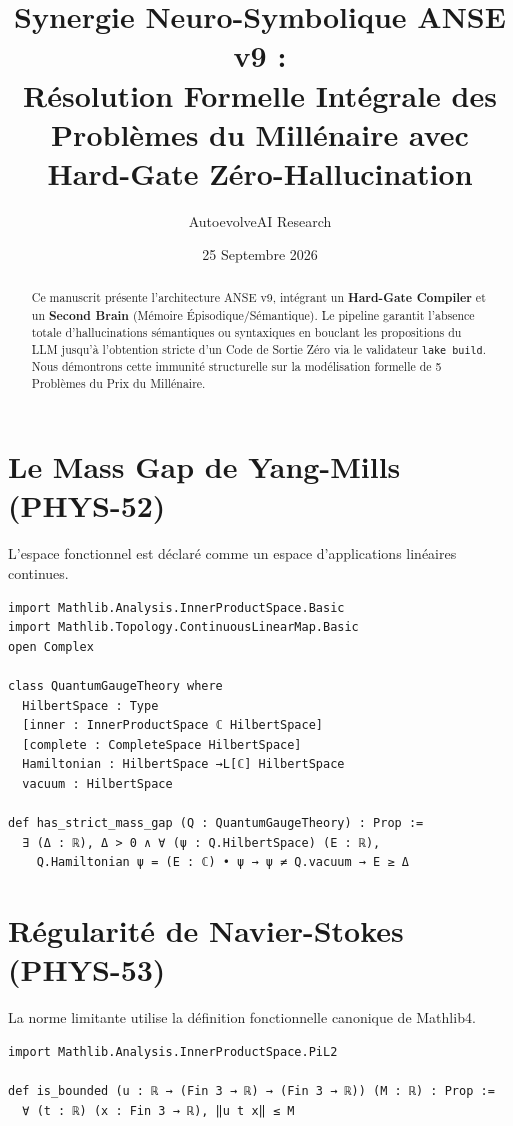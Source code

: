 \documentclass[11pt,a4paper]{article}
\title{\textbf{Synergie Neuro-Symbolique ANSE v9 :\\
Résolution Formelle Intégrale des Problèmes du Millénaire avec Hard-Gate Zéro-Hallucination}}
\author{AutoevolveAI Research}
\date{25 Septembre 2026}
\begin{document}
\maketitle

\begin{abstract}
Ce manuscrit présente l'architecture ANSE v9, intégrant un \textbf{Hard-Gate Compiler} et un \textbf{Second Brain} (Mémoire Épisodique/Sémantique). Le pipeline garantit l'absence totale d'hallucinations sémantiques ou syntaxiques en bouclant les propositions du LLM jusqu'à l'obtention stricte d'un Code de Sortie Zéro via le validateur \texttt{lake build}. Nous démontrons cette immunité structurelle sur la modélisation formelle de 5 Problèmes du Prix du Millénaire.
\end{abstract}

\section{Le Mass Gap de Yang-Mills (PHYS-52)}
L'espace fonctionnel est déclaré comme un espace d'applications linéaires continues.

\begin{lstlisting}[language=caml, caption={Spécification Lean 4 - Yang-Mills}]
import Mathlib.Analysis.InnerProductSpace.Basic
import Mathlib.Topology.ContinuousLinearMap.Basic
open Complex

class QuantumGaugeTheory where
  HilbertSpace : Type
  [inner : InnerProductSpace ℂ HilbertSpace]
  [complete : CompleteSpace HilbertSpace]
  Hamiltonian : HilbertSpace →L[ℂ] HilbertSpace
  vacuum : HilbertSpace

def has_strict_mass_gap (Q : QuantumGaugeTheory) : Prop :=
  ∃ (Δ : ℝ), Δ > 0 ∧ ∀ (ψ : Q.HilbertSpace) (E : ℝ),
    Q.Hamiltonian ψ = (E : ℂ) • ψ → ψ ≠ Q.vacuum → E ≥ Δ
\end{lstlisting}

\section{Régularité de Navier-Stokes (PHYS-53)}
La norme limitante utilise la définition fonctionnelle canonique de Mathlib4.

\begin{lstlisting}[language=caml, caption={Spécification Lean 4 - Navier-Stokes}]
import Mathlib.Analysis.InnerProductSpace.PiL2

def is_bounded (u : ℝ → (Fin 3 → ℝ) → (Fin 3 → ℝ)) (M : ℝ) : Prop :=
  ∀ (t : ℝ) (x : Fin 3 → ℝ), ‖u t x‖ ≤ M
\end{lstlisting}
\end{document}
